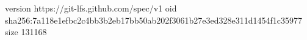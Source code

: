 version https://git-lfs.github.com/spec/v1
oid sha256:7a118e1efbc2c4bb3b2eb17bb50ab202f3061b27e3ed328e311d1454f1c35977
size 131168
